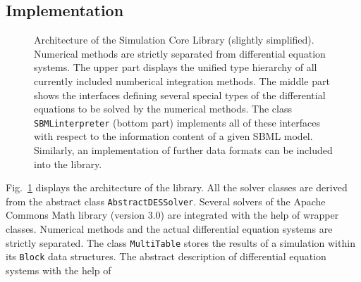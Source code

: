 \documentclass{bioinfo}
\newcommand{\AbstractDESSolver}{\texttt{Abstract\-DES\-Solver}}
\newcommand{\SBMLinterpreter}{\texttt{SBML\-interpreter}}
\newcommand{\MultiTable}{\texttt{Multi\-Table}}
\newcommand{\Block}{\texttt{Block}}
\begin{document}
\begin{methods}
\section{Implementation}
\begin{figure}
\caption[Architecture of the Simulation Core Library]{Architecture of
the Simulation Core Library (slightly simplified). Numerical methods are
strictly separated from differential equation systems. The upper part displays
the unified type hierarchy of all currently included numberical integration
methods. The middle part shows the interfaces defining several
special types of the differential equations to be solved by the numerical
methods.
The class \SBMLinterpreter{} (bottom part) implements all of these interfaces
with respect to the information content of a given SBML model. Similarly, an
implementation of further data formats can be included into the
library.\vspace{-.6cm}}
\label{fig:Architecture}
\end{figure}
Fig.~\ref{fig:Architecture} displays the architecture of the library. All the
solver classes are derived from the abstract class \AbstractDESSolver.
Several solvers of the Apache Commons Math library (version 3.0) are integrated
with the help of wrapper classes. Numerical methods and the actual differential
equation systems are strictly separated. The class \MultiTable{} stores the
results of a simulation within its \Block{} data structures. 
%
The abstract description of differential equation systems with the help of

\end{methods}
\end{document}
